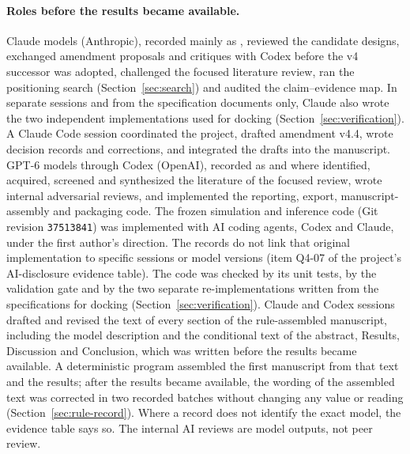 \paragraph{Roles before the results became available.}
Claude models (Anthropic), recorded mainly as , reviewed the candidate designs, exchanged amendment proposals and critiques with Codex before the v4 successor was adopted, challenged the focused literature review, ran the positioning search (Section~\ref{sec:search}) and audited the claim--evidence map. %
In separate sessions and from the specification documents only, Claude also wrote the two independent implementations used for docking (Section~\ref{sec:verification}). A Claude Code session coordinated the project, drafted amendment v4.4, wrote decision records and corrections, and integrated the drafts into the manuscript. %
GPT-6 models through Codex (OpenAI), recorded as  and  where identified, acquired, screened and synthesized the literature of the focused review, wrote internal adversarial reviews, and implemented the reporting, export, manuscript-assembly and packaging code. %
The frozen simulation and inference code (Git revision \texttt{37513841}) was implemented with AI coding agents, Codex and Claude, under the first author's direction. The records do not link that original implementation to specific sessions or model versions (item Q4-07 of the project's AI-disclosure evidence table). The code was checked by its unit tests, by the validation gate and by the two separate re-implementations written from the specifications for docking (Section~\ref{sec:verification}).
Claude and Codex sessions drafted and revised the text of every section of the rule-assembled manuscript, including the model description and the conditional text of the abstract, Results, Discussion and Conclusion, which was written before the results became available. A deterministic program assembled the first manuscript from that text and the results; after the results became available, the wording of the assembled text was corrected in two recorded batches without changing any value or reading (Section~\ref{sec:rule-record}). %
Where a record does not identify the exact model, the evidence table says so. The internal AI reviews are model outputs, not peer review. %

